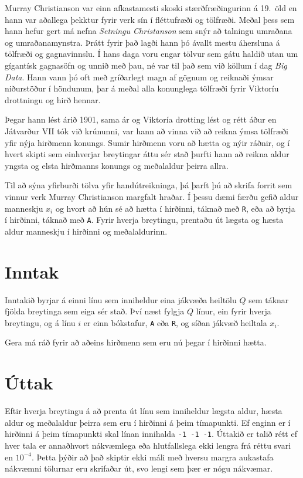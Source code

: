 
Murray Christianson var einn afkastamesti skoski stærðfræðingurinn á 19.\ öld en
hann var aðallega þekktur fyrir verk sín í fléttufræði og tölfræði.  Meðal
þess sem hann hefur gert má nefna \emph{Setningu Christanson} sem snýr að
talningu umraðana og umraðanamynstra. Þrátt fyrir það lagði hann þó ávallt mestu
áhersluna á tölfræði og gagnavinnslu. Í hans daga voru engar tölvur sem gátu
haldið utan um gígantísk gagnasöfn og unnið með þau, né var til það sem við
köllum í dag \emph{Big Data}. Hann vann þó oft með gríðarlegt magn af gögnum og
reiknaði ýmsar niðurstöður í höndunum, þar á meðal alla konunglega tölfræði
fyrir Viktoríu drottningu og hirð hennar.

Þegar hann lést árið 1901, sama ár og Viktoría drotting lést og rétt áður
en Játvarður VII tók við krúnunni, var hann að vinna við að reikna ýmsa tölfræði
yfir nýja hirðmenn konungs. Sumir hirðmenn voru að hætta og nýir ráðnir, og í
hvert skipti sem einhverjar breytingar áttu sér stað þurfti hann að reikna
aldur yngsta og elsta hirðmanns konungs og meðalaldur þeirra allra.

Til að sýna yfirburði tölva yfir handútreikninga, þá þarft þú að skrifa forrit
sem vinnur verk Murray Christianson margfalt hraðar. Í þessu dæmi færðu gefið
aldur manneskju $x_i$ og hvort að hún sé að hætta í hirðinni, táknað með
\texttt{R}, eða að byrja í hirðinni, táknað með \texttt{A}. Fyrir hverja
breytingu, prentaðu út lægsta og hæsta aldur manneskju í hirðinni og
meðalaldurinn.

\section*{Inntak}
Inntakið byrjar á einni línu sem inniheldur eina jákvæða heiltölu $Q$ sem
táknar fjölda breytinga sem eiga sér stað. Því næst fylgja $Q$ línur, ein fyrir
hverja breytingu, og á línu $i$ er einn bókstafur, \texttt{A} eða \texttt{R}, og
síðan jákvæð heiltala $x_i$.

Gera má ráð fyrir að aðeins hirðmenn sem eru nú þegar í hirðinni hætta.

\section*{Úttak}
Eftir hverja breytingu á að prenta út línu sem inniheldur lægsta aldur, hæsta
aldur og meðalaldur þeirra sem eru í hirðinni á þeim tímapunkti. Ef enginn er í
hirðinni á þeim tímapunkti skal línan innihalda \texttt{-1~-1~-1}. Úttakið er
talið rétt ef hver tala er annaðhvort nákvæmlega eða hlutfallslega ekki lengra
frá réttu svari en $10^{-4}$. Þetta þýðir að það skiptir ekki máli með hversu
margra aukastafa nákvæmni tölurnar eru skrifaðar út, svo lengi sem þær er nógu
nákvæmar.

